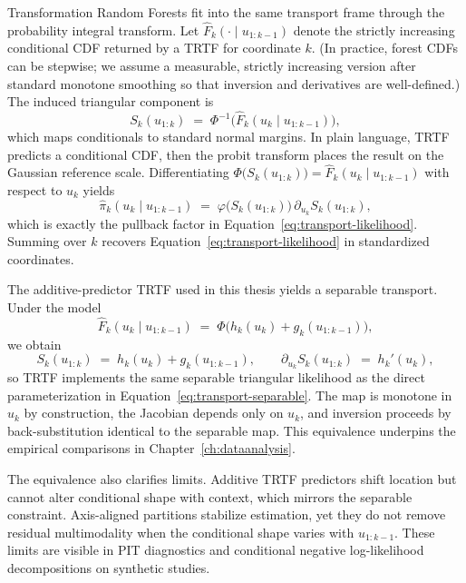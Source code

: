 \documentclass[11pt,a4paper,twoside]{book}\usepackage[]{graphicx}\usepackage[]{xcolor}
\begin{document}
Transformation Random Forests \citep{hothorn2017transformation,hothorn2018conditional,hothorn2021transformation} fit into the same transport frame through the probability integral transform. Let $\widehat F_k(\cdot \mid u_{1:k-1})$ denote the strictly increasing conditional CDF returned by a TRTF for coordinate $k$. (In practice, forest CDFs can be stepwise; we assume a measurable, strictly increasing version after standard monotone smoothing so that inversion and derivatives are well-defined.) The induced triangular component is
\begin{equation}
  S_k(u_{1:k}) \;=\; \Phi^{-1}\!\Big(\widehat F_k(u_k \mid u_{1:k-1})\Big),\label{eq:transport-trtf-map}
\end{equation}
which maps conditionals to standard normal margins. In plain language, TRTF predicts a conditional CDF, then the probit transform places the result on the Gaussian reference scale. Differentiating $\Phi\!\big(S_k(u_{1:k})\big)=\widehat F_k(u_k \mid u_{1:k-1})$ with respect to $u_k$ yields
\begin{equation}
  \widehat \pi_k(u_k \mid u_{1:k-1}) \;=\; \varphi\!\big(S_k(u_{1:k})\big)\,\partial_{u_k}S_k(u_{1:k}),\label{eq:transport-trtf-likelihood}
\end{equation}
which is exactly the pullback factor in Equation~\eqref{eq:transport-likelihood}. Summing over $k$ recovers Equation~\eqref{eq:transport-likelihood} in standardized coordinates.

The additive-predictor TRTF used in this thesis yields a separable transport. Under the model
\begin{equation}
  \widehat F_k(u_k \mid u_{1:k-1}) \;=\; \Phi\!\big(h_k(u_k) + g_k(u_{1:k-1})\big),\label{eq:transport-trtf-additive}
\end{equation}
we obtain
\begin{equation}
  S_k(u_{1:k}) \;=\; h_k(u_k) + g_k(u_{1:k-1}),\qquad \partial_{u_k}S_k(u_{1:k}) \;=\; h_k'(u_k),\label{eq:transport-trtf-separable}
\end{equation}
so TRTF implements the same separable triangular likelihood as the direct parameterization in Equation~\eqref{eq:transport-separable}. The map is monotone in $u_k$ by construction, the Jacobian depends only on $u_k$, and inversion proceeds by back-substitution identical to the separable map. This equivalence underpins the empirical comparisons in Chapter~\ref{ch:dataanalysis}.

The equivalence also clarifies limits. Additive TRTF predictors shift location but cannot alter conditional shape with context, which mirrors the separable constraint. Axis-aligned partitions stabilize estimation, yet they do not remove residual multimodality when the conditional shape varies with $u_{1:k-1}$. These limits are visible in PIT diagnostics and conditional negative log-likelihood decompositions on synthetic studies.
\end{document}
